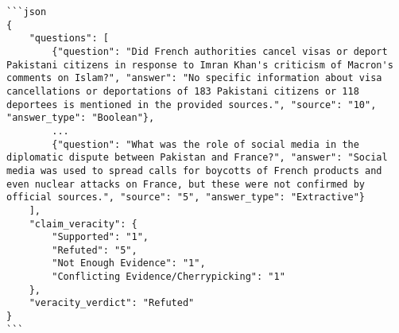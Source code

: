 \documentclass[oneside]{ctuthesis}
\theoremstyle{plain}
\theoremstyle{definition}
\theoremstyle{note}
\begin{document}
\begin{figure*}
\begin{lstlisting}[breaklines=true, language={}, frame=single, caption={Qwen3 thinking tokens example.}, label={lst:think}]
```json
{
    "questions": [
        {"question": "Did French authorities cancel visas or deport Pakistani citizens in response to Imran Khan's criticism of Macron's comments on Islam?", "answer": "No specific information about visa cancellations or deportations of 183 Pakistani citizens or 118 deportees is mentioned in the provided sources.", "source": "10", "answer_type": "Boolean"},
        ...
        {"question": "What was the role of social media in the diplomatic dispute between Pakistan and France?", "answer": "Social media was used to spread calls for boycotts of French products and even nuclear attacks on France, but these were not confirmed by official sources.", "source": "5", "answer_type": "Extractive"}
    ],
    "claim_veracity": {
        "Supported": "1",
        "Refuted": "5",
        "Not Enough Evidence": "1",
        "Conflicting Evidence/Cherrypicking": "1"
    },
    "veracity_verdict": "Refuted"
}
```
    \end{lstlisting}
\end{figure*}
\end{document}
